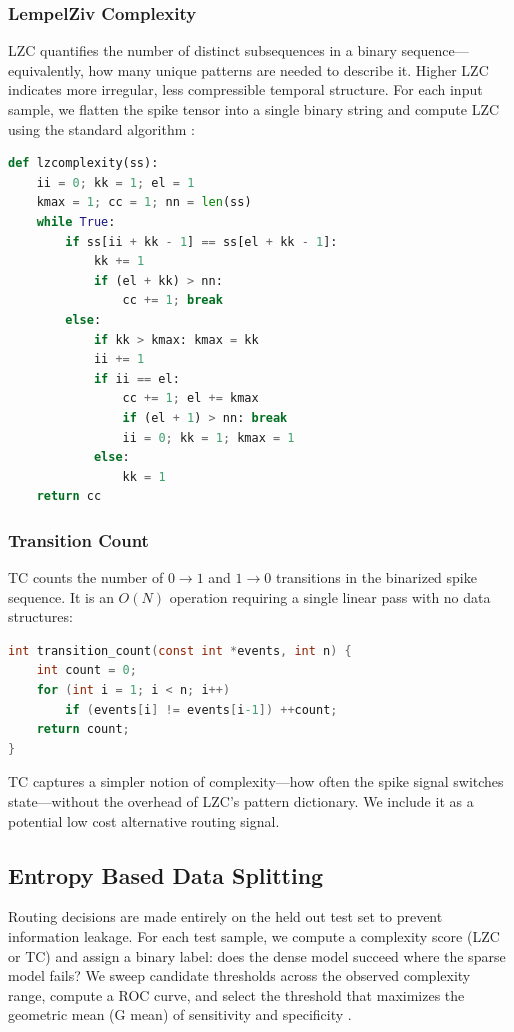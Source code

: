 \documentclass[conference]{IEEEtran}
\begin{document}
\subsubsection{LempelZiv Complexity}

LZC quantifies the number of distinct subsequences in a binary sequence—equivalently, how many unique patterns are needed to describe it. Higher LZC indicates more irregular, less compressible temporal structure. For each input sample, we flatten the spike tensor into a single binary string and compute LZC using the standard algorithm \cite{besson2016lzpython}:

\begin{lstlisting}[language=Python]
def lzcomplexity(ss):
    ii = 0; kk = 1; el = 1
    kmax = 1; cc = 1; nn = len(ss)
    while True:
        if ss[ii + kk - 1] == ss[el + kk - 1]:
            kk += 1
            if (el + kk) > nn:
                cc += 1; break
        else:
            if kk > kmax: kmax = kk
            ii += 1
            if ii == el:
                cc += 1; el += kmax
                if (el + 1) > nn: break
                ii = 0; kk = 1; kmax = 1
            else:
                kk = 1
    return cc
\end{lstlisting}

\subsubsection{Transition Count}

TC counts the number of $0{\to}1$ and $1{\to}0$ transitions in the binarized spike sequence. It is an $O(N)$ operation requiring a single linear pass with no data structures:

\begin{lstlisting}[language=C]
int transition_count(const int *events, int n) {
    int count = 0;
    for (int i = 1; i < n; i++)
        if (events[i] != events[i-1]) ++count;
    return count;
}
\end{lstlisting}

TC captures a simpler notion of complexity—how often the spike signal switches state—without the overhead of LZC's pattern dictionary. We include it as a potential low cost alternative routing signal.

\subsection{Entropy Based Data Splitting}

Routing decisions are made entirely on the held out test set to prevent information leakage. For each test sample, we compute a complexity score (LZC or TC) and assign a binary label: does the dense model succeed where the sparse model fails? We sweep candidate thresholds across the observed complexity range, compute a ROC curve, and select the threshold that maximizes the geometric mean (G mean) of sensitivity and specificity \cite{teerapittayanon2016branchynet, smetek2017thresholdROC, yang2020energyawareCascade}.
\end{document}
